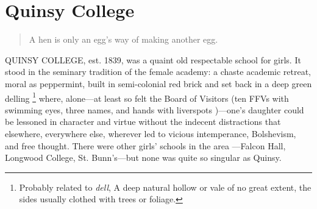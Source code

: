 \chapter{ Quinsy College}

\begin{quotation}
  A hen is only an egg's way of making another egg.
\end{quotation}
 
  QUINSY COLLEGE, est. 1839, was a quaint 
old respectable school for girls. It
stood in the seminary tradition of the female academy: a chaste 
academic retreat, moral as peppermint, 
built in semi-colonial red brick and set back in a deep green delling 
\footnote{ \textdbend Probably related to \textit{dell}, A deep natural hollow
  or vale of no great extent, the sides usually clothed with trees or foliage.}
where, alone---at least so felt the Board of Visitors (ten FFVs
with swimming eyes, three names, and hands with liverspots
)---one's daughter could
be lessoned in character and virtue without the indecent distractions that
elsewhere, everywhere else, wherever led to vicious intemperance, 
Bolshevism, and free thought. There were other girls' schools in the area 
---Falcon Hall, Longwood College, St. Bunn's---but none was quite so singular 
as Quinsy.

